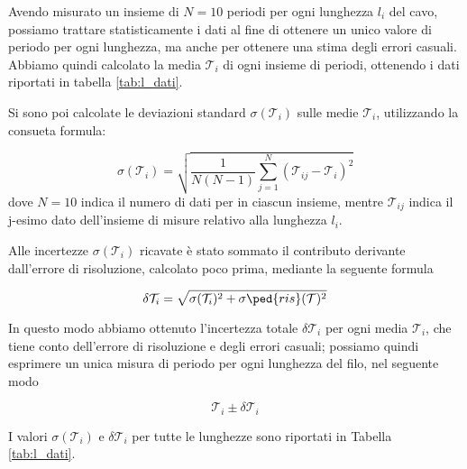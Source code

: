 Avendo misurato un insieme di $N = 10$ periodi per ogni lunghezza $l_i$ del cavo, possiamo trattare statisticamente i dati
al fine di ottenere un unico valore di periodo per ogni lunghezza, ma anche per ottenere una stima degli errori casuali.
Abbiamo quindi calcolato la media $\mathcal{T}_i$ di ogni insieme di periodi, ottenendo i dati riportati in tabella \ref{tab:l_dati}.

Si sono poi calcolate le deviazioni standard $\sigma(\mathcal{T}_i)$ sulle medie $\mathcal{T}_i$, utilizzando la consueta formula:

\begin{equation}
	\sigma(\mathcal{T}_i) = \sqrt{\frac{1}{N(N - 1)}\sum_{j=1}^N (\mathcal{T}_{ij} - \mathcal{T}_i)^2}
\end{equation}
%
dove $N = 10$ indica il numero di dati per in ciascun insieme, mentre $\mathcal{T}_{ij}$ indica il j-esimo dato dell'insieme di misure
relativo alla lunghezza $l_i$.

Alle incertezze $\sigma(\mathcal{T}_i)$ ricavate è stato sommato il contributo derivante dall'errore di risoluzione, calcolato poco prima,
mediante la seguente formula

\begin{equation}
	\delta\mathcal{T}_i = \sqrt{\sigma(\mathcal{T}_i)^2 + \sigma\ped{ris}(\mathcal{T})^2}
\end{equation}

In questo modo abbiamo ottenuto l'incertezza totale $\delta\mathcal{T}_i$ per ogni media $\mathcal{T}_i$, che tiene conto
dell'errore di risoluzione e degli errori casuali; possiamo quindi esprimere 
un unica misura di periodo per ogni lunghezza del filo, nel seguente modo

\begin{equation}
	\mathcal{T}_i \pm \delta\mathcal{T}_i
\end{equation}

I valori $\sigma(\mathcal{T}_i)$ e $\delta\mathcal{T}_i$ per tutte le lunghezze sono riportati in Tabella \ref{tab:l_dati}.

